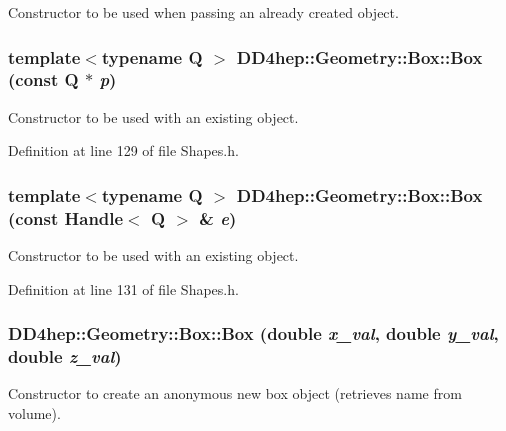 Constructor to be used when passing an already created object. \hypertarget{class_d_d4hep_1_1_geometry_1_1_box_a69e271d2559a34b12ce114e565b5afa8}{
\subsubsection[{Box}]{\setlength{\rightskip}{0pt plus 5cm}template$<$typename Q $>$ DD4hep::Geometry::Box::Box (const Q $\ast$ {\em p})}}
\label{class_d_d4hep_1_1_geometry_1_1_box_a69e271d2559a34b12ce114e565b5afa8}


Constructor to be used with an existing object. 

Definition at line 129 of file Shapes.h.\hypertarget{class_d_d4hep_1_1_geometry_1_1_box_a6bf3baf101c4aa3ced9ada94ff42d651}{
\subsubsection[{Box}]{\setlength{\rightskip}{0pt plus 5cm}template$<$typename Q $>$ DD4hep::Geometry::Box::Box (const {\bf Handle}$<$ Q $>$ \& {\em e})}}
\label{class_d_d4hep_1_1_geometry_1_1_box_a6bf3baf101c4aa3ced9ada94ff42d651}


Constructor to be used with an existing object. 

Definition at line 131 of file Shapes.h.\hypertarget{class_d_d4hep_1_1_geometry_1_1_box_a81ef6c7eef4559047f89d4cd7ab10ca8}{
\subsubsection[{Box}]{\setlength{\rightskip}{0pt plus 5cm}DD4hep::Geometry::Box::Box (double {\em x\_\-val}, \/  double {\em y\_\-val}, \/  double {\em z\_\-val})}}
\label{class_d_d4hep_1_1_geometry_1_1_box_a81ef6c7eef4559047f89d4cd7ab10ca8}


Constructor to create an anonymous new box object (retrieves name from volume). 

